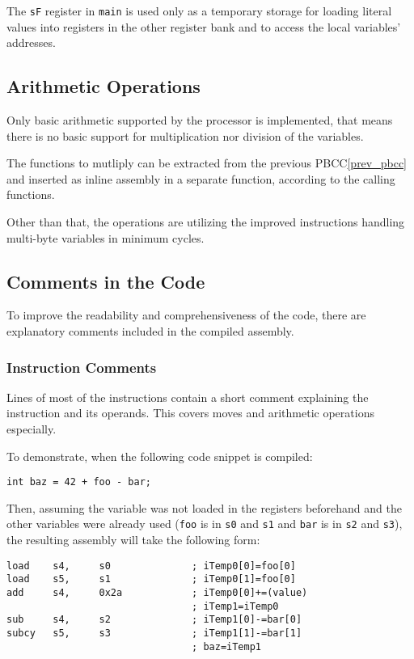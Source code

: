         The \texttt{sF} register in \texttt{main} is used only as a temporary storage for loading literal values into registers in the other register bank and to access the local variables' addresses.

        \subsection{Arithmetic Operations}

        Only basic arithmetic supported by the processor is implemented, that means there is no basic support for multiplication nor division of the variables.

        The functions to mutliply can be extracted from the previous PBCC\ref{prev_pbcc} and inserted as inline assembly in a separate function, according to the calling functions.

        Other than that, the operations are utilizing the improved instructions handling multi-byte variables in minimum cycles.

        \subsection{Comments in the Code}

        To improve the readability and comprehensiveness of the code, there are explanatory comments included in the compiled assembly.

            \subsubsection{Instruction Comments}

            Lines of most of the instructions contain a short comment explaining the instruction and its operands. This covers moves and arithmetic operations especially.

            To demonstrate, when the following code snippet is compiled:

            \begin{center}\texttt{int baz = 42 + foo - bar;}\end{center}

            Then, assuming the variable was not loaded in the registers beforehand and the other variables were already used (\texttt{foo} is in \texttt{s0} and \texttt{s1} and \texttt{bar} is in \texttt{s2} and \texttt{s3}), the resulting assembly will take the following form:

            \begin{center}
\begin{verbatim}load    s4,     s0              ; iTemp0[0]=foo[0]
load    s5,     s1              ; iTemp0[1]=foo[0]
add     s4,     0x2a            ; iTemp0[0]+=(value)
                                ; iTemp1=iTemp0
sub     s4,     s2              ; iTemp1[0]-=bar[0]
subcy   s5,     s3              ; iTemp1[1]-=bar[1]
                                ; baz=iTemp1\end{verbatim}\end{center}


